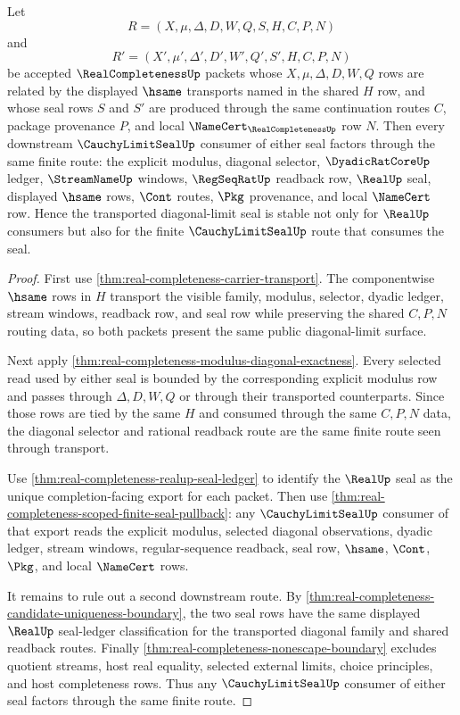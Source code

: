 \begin{theorem}
\label{thm:real-completeness-cauchylimitseal-transport-stability}
Let
$$
R=(X,\mu,\Delta,D,W,Q,S,H,C,P,N)
$$
and
$$
R'=(X',\mu',\Delta',D',W',Q',S',H,C,P,N)
$$
be accepted $\RealCompletenessUp$ packets whose $X,\mu,\Delta,D,W,Q$ rows are related by the displayed $\hsame$ transports named in the shared $H$ row, and whose seal rows $S$ and $S'$ are produced through the same continuation routes $C$, package provenance $P$, and local $\NameCert_{\RealCompletenessUp}$ row $N$. Then every downstream $\CauchyLimitSealUp$ consumer of either seal factors through the same finite route: the explicit modulus, diagonal selector, $\DyadicRatCoreUp$ ledger, $\StreamNameUp$ windows, $\RegSeqRatUp$ readback row, $\RealUp$ seal, displayed $\hsame$ rows, $\Cont$ routes, $\Pkg$ provenance, and local $\NameCert$ row. Hence the transported diagonal-limit seal is stable not only for $\RealUp$ consumers but also for the finite $\CauchyLimitSealUp$ route that consumes the seal.
\end{theorem}
\begin{proof}
First use \autoref{thm:real-completeness-carrier-transport}. The componentwise $\hsame$ rows in $H$ transport the visible family, modulus, selector, dyadic ledger, stream windows, readback row, and seal row while preserving the shared $C,P,N$ routing data, so both packets present the same public diagonal-limit surface.

Next apply \autoref{thm:real-completeness-modulus-diagonal-exactness}. Every selected read used by either seal is bounded by the corresponding explicit modulus row and passes through $\Delta,D,W,Q$ or through their transported counterparts. Since those rows are tied by the same $H$ and consumed through the same $C,P,N$ data, the diagonal selector and rational readback route are the same finite route seen through transport.

Use \autoref{thm:real-completeness-realup-seal-ledger} to identify the $\RealUp$ seal as the unique completion-facing export for each packet. Then use \autoref{thm:real-completeness-scoped-finite-seal-pullback}: any $\CauchyLimitSealUp$ consumer of that export reads the explicit modulus, selected diagonal observations, dyadic ledger, stream windows, regular-sequence readback, seal row, $\hsame$, $\Cont$, $\Pkg$, and local $\NameCert$ rows.

It remains to rule out a second downstream route. By \autoref{thm:real-completeness-candidate-uniqueness-boundary}, the two seal rows have the same displayed $\RealUp$ seal-ledger classification for the transported diagonal family and shared readback routes. Finally \autoref{thm:real-completeness-nonescape-boundary} excludes quotient streams, host real equality, selected external limits, choice principles, and host completeness rows. Thus any $\CauchyLimitSealUp$ consumer of either seal factors through the same finite route.
\end{proof}

